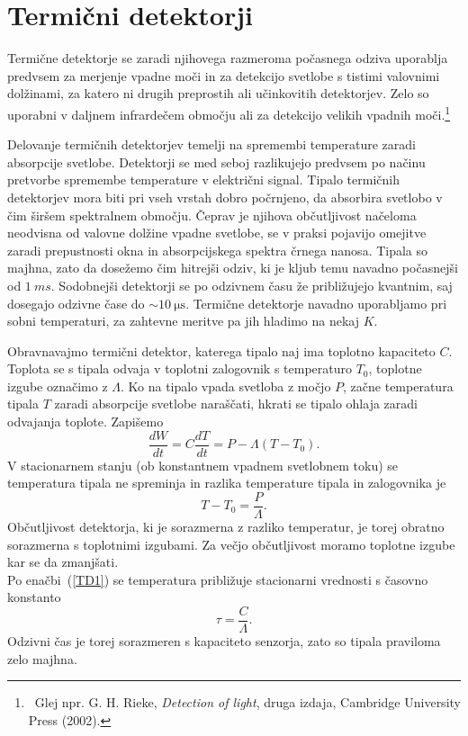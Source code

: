 \section{Termični detektorji}
Termične detektorje se zaradi njihovega razmeroma počasnega odziva uporablja predvsem 
za merjenje vpadne moči in za detekcijo svetlobe s tistimi valovnimi dolžinami, za katero 
ni drugih preprostih ali učinkovitih detektorjev. Zelo so uporabni v daljnem
infrardečem območju ali za detekcijo velikih vpadnih moči.\footnote{~Glej npr. G. H. Rieke, {\it Detection 
of light}, druga izdaja, Cambridge University Press (2002).}

Delovanje termičnih detektorjev temelji na spremembi temperature zaradi absorpcije svetlobe. 
Detektorji se med seboj razlikujejo predvsem po načinu pretvorbe spremembe 
temperature v električni signal.
Tipalo termičnih detektorjev mora biti pri vseh vrstah dobro počrnjeno, da absorbira
svetlobo v čim širšem spektralnem območju. Čeprav je njihova občutljivost načeloma 
neodvisna od valovne dolžine vpadne svetlobe, se v praksi pojavijo omejitve zaradi
prepustnosti okna in absorpcijskega spektra črnega nanosa. Tipala so majhna, zato 
da dosežemo čim hitrejši odziv, ki je kljub temu navadno počasnejši od $1~\si{ms}$. 
Sodobnejši detektorji se po odzivnem času že približujejo 
kvantnim, saj dosegajo odzivne čase do $\sim 10~\si{\micro\second}$. 
Termične detektorje navadno uporabljamo pri sobni temperaturi,  
za zahtevne meritve pa jih hladimo na nekaj $\si{K}$. 

Obravnavajmo termični detektor, katerega tipalo naj ima toplotno kapaciteto $C$. Toplota
se s tipala odvaja v toplotni zalogovnik s temperaturo $T_0$, 
toplotne izgube označimo z $\Lambda$. Ko na tipalo vpada svetloba z močjo $P$, 
začne temperatura tipala $T$ zaradi absorpcije svetlobe naraščati, hkrati se tipalo 
ohlaja zaradi odvajanja toplote. Zapišemo
\begin{equation}
\frac{dW}{dt} = C \frac{dT}{dt} = P - \Lambda (T-T_0).
\label{TD1}
\end{equation}
V stacionarnem stanju (ob konstantnem vpadnem svetlobnem toku) se
temperatura tipala ne spreminja in razlika temperature tipala in zalogovnika je 
\begin{equation}
T - T_0 = \frac{P}{\Lambda}.
\label{temp_sens}
\end{equation}
Občutljivost detektorja, ki je sorazmerna z razliko temperatur, 
je torej obratno sorazmerna s toplotnimi izgubami. Za večjo občutljivost moramo
toplotne izgube kar se da zmanjšati. \\
Po enačbi~(\ref{TD1}) se temperatura približuje stacionarni vrednosti s časovno konstanto 
\begin{equation}
\tau = \frac{C}{\Lambda}.
\label{TermD_t}
\end{equation}
Odzivni čas je torej sorazmeren s kapaciteto senzorja, zato so tipala praviloma 
zelo majhna.

